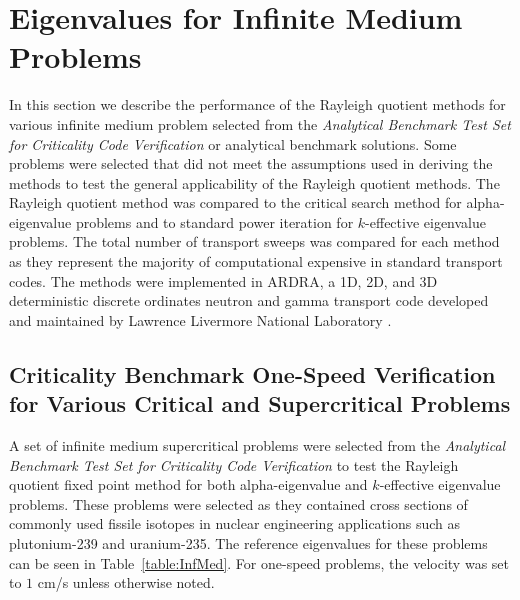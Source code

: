 \chapter{Eigenvalues for Infinite Medium Problems}%

In this section we describe the performance of the Rayleigh quotient methods for various infinite medium problem selected from the \textit{Analytical Benchmark Test Set for Criticality Code Verification} \cite{sood2003analytical} or analytical benchmark solutions. Some problems were selected that did not meet the assumptions used in deriving the methods to test the general applicability of the Rayleigh quotient methods. The Rayleigh quotient method was compared to the critical search method \cite{hill_efficient_1983} for alpha-eigenvalue problems and to standard power iteration for $k$-effective eigenvalue problems. The total number of transport sweeps was compared for each method as they represent the majority of computational expensive in standard transport codes. The methods were implemented in ARDRA, a 1D, 2D, and 3D deterministic discrete ordinates neutron and gamma transport code developed and maintained by Lawrence Livermore National Laboratory \cite{hanebutte_ardra_1999}.





\section{Criticality Benchmark One-Speed Verification for Various Critical and Supercritical Problems}

A set of infinite medium supercritical problems were selected from the \textit{Analytical Benchmark Test Set for Criticality Code Verification} \cite{sood2003analytical} to test the Rayleigh quotient fixed point method for both alpha-eigenvalue and $k$-effective eigenvalue problems. These problems were selected as they contained cross sections of commonly used fissile isotopes in nuclear engineering applications such as plutonium-239 and uranium-235. The reference eigenvalues for these problems can be seen in Table~\ref{table:InfMed}. For one-speed problems, the velocity was set to $1$ cm/s unless otherwise noted.

